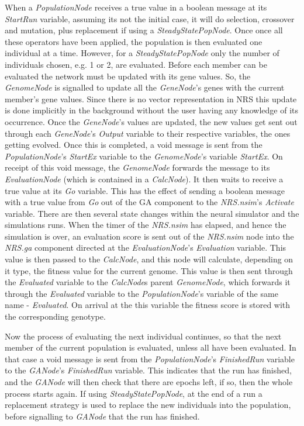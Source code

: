 \documentclass[10pt, notitlepage, a4paper]{article}
\begin{document}
When a {\it PopulationNode} receives a true value in a boolean message at its {\it StartRun} variable, assuming its not the initial case, it will do selection, crossover and mutation, plus replacement if using a {\it SteadyStatePopNode}. Once once all these operators have been applied, the population is then evaluated one individual at a time. However, for a {\it SteadyStatePopNode} only the number of individuals chosen, e.g. 1 or 2, are evaluated. Before each member can be evaluated the network must be updated with its gene values. So, the {\it GenomeNode} is signalled to update all the {\it GeneNode}'s genes with the current member's gene values. Since there is no vector representation in NRS this update is done implicitly in the background without the user having any knowledge of its occurrence. Once the {\it GeneNode}'s values are updated, the new values get sent out through each {\it GeneNode}'s {\it Output} variable to their respective variables, the ones getting evolved. Once this is completed, a void message is sent from the {\it PopulationNode}'s {\it StartEx} variable to the {\it GenomeNode}'s variable {\it StartEx}. On receipt of this void message, the {\it GenomeNode} forwards the message to its {\it EvaluationNode} (which is contained in a {\it CalcNode}). It then waits to receive a true value at its {\it Go} variable. This has the effect of sending a boolean message with a true value from {\it Go} out of the GA component to the {\it NRS.nsim}'s {\it Activate} variable. There are then several state changes within the neural simulator and the simulations runs. When the timer of the {\it NRS.nsim} has elapsed, and hence the simulation is over, an evaluation score is sent out of the {\it NRS.nsim} node into the {\it NRS.ga} component directed at the {\it EvaluationNode}'s {\it Evaluation} variable. This value is then passed to the {\it CalcNode}, and this node will calculate, depending on it type, the fitness value for the current genome. This value is then sent through the {\it Evaluated} variable to the {\it CalcNode}s parent {\it GenomeNode}, which forwards it through the {\it Evaluated} variable to the {\it PopulationNode}'s variable of the same name - {\it Evaluated}. On arrival at the this variable the fitness score is stored with the corresponding genotype.

Now the process of evaluating the next individual continues, so that the next member of the current population is evaluated, unless all have been evaluated. In that case a void message is sent from the {\it PopulationNode}'s {\it FinishedRun} variable to the {\it GANode}'s {\it FinishedRun} variable. This indicates that the run has finished, and the {\it GANode} will then check that there are epochs left, if so, then the whole process starts again. If using {\it SteadyStatePopNode}, at the end of a run a replacement strategy is used to replace the new individuals into the population, before signalling to {\it GANode} that the run has finished.
\end{document}
